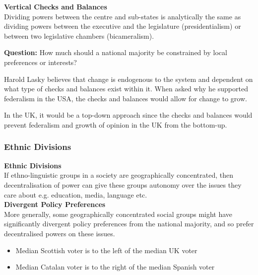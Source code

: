 \documentclass[12pt, letterpaper]{article}
\begin{document}
\textbf{Vertical Checks and Balances}\\
Dividing powers between the centre and sub-states is analytically the same as dividing powers between the executive and the legislature (presidentialism) or between two legislative chambers (bicameralism).

\textbf{Question:} How much should a national majority be constrained by local preferences or interests?

Harold Lasky believes that change is endogenous to the system and dependent on what type of checks and balances exist within it. When asked why he supported federalism in the USA, the checks and balances would allow for change to grow.

In the UK, it would be a top-down approach since the checks and balances would prevent federalism and growth of opinion in the UK from the bottom-up.

\subsubsection{Ethnic Divisions}
\textbf{Ethnic Divisions}\\
If ethno-linguistic groups in a society are geographically concentrated, then decentralisation of power can give these groups autonomy over the issues they care about e.g. education, media, language etc.\\
\textbf{Divergent Policy Preferences}\\
More generally, some geographically concentrated social groups might have significantly divergent policy preferences from the national majority, and so prefer decentralised powers on these issues.
\begin{itemize}
	\item Median Scottish voter is to the left of the median UK voter
	\item Median Catalan voter is to the right of the median Spanish voter
\end{itemize}
\end{document}
